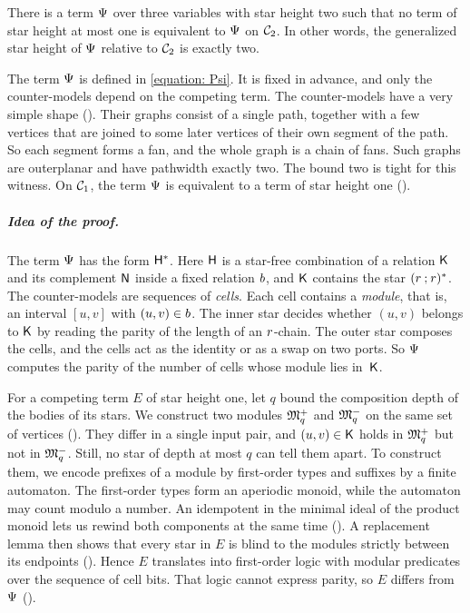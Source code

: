 \begin{theorem}\label{theorem: main}
  There is a term $\Psi$ over three variables with star height two such that no term of star height at most one is equivalent to $\Psi$ on $\mathcal{C}_{2}$.
  In other words, the generalized star height of $\Psi$ relative to $\mathcal{C}_{2}$ is exactly two.
\end{theorem}

The term $\Psi$ is defined in \eqref{equation: Psi}.
It is fixed in advance, and only the counter-models depend on the competing term.
The counter-models have a very simple shape ().
Their graphs consist of a single path, together with a few vertices that are joined to some later vertices of their own segment of the path.
So each segment forms a fan, and the whole graph is a chain of fans.
Such graphs are outerplanar and have pathwidth exactly two.
The bound two is tight for this witness.
On $\mathcal{C}_{1}$, the term $\Psi$ is equivalent to a term of star height one ().

\subparagraph*{Idea of the proof.}
The term $\Psi$ has the form $\mathsf{H}^*$.
Here $\mathsf{H}$ is a star-free combination of a relation $\mathsf{K}$ and its complement $\mathsf{N}$ inside a fixed relation $b$, and $\mathsf{K}$ contains the star $(r \mathbin{;} r)^*$.
The counter-models are sequences of \emph{cells}.
Each cell contains a \emph{module}, that is, an interval $[u, v]$ with $(u, v) \in b$.
The inner star decides whether $(u, v)$ belongs to $\mathsf{K}$ by reading the parity of the length of an $r$-chain.
The outer star composes the cells, and the cells act as the identity or as a swap on two ports.
So $\Psi$ computes the parity of the number of cells whose module lies in~$\mathsf{K}$.

For a competing term $E$ of star height one, let $q$ bound the composition depth of the bodies of its stars.
We construct two modules $\mathfrak{M}^{+}_q$ and $\mathfrak{M}^{-}_q$ on the same set of vertices ().
They differ in a single input pair, and $(u, v) \in \mathsf{K}$ holds in $\mathfrak{M}^{+}_q$ but not in $\mathfrak{M}^{-}_q$.
Still, no star of depth at most $q$ can tell them apart.
To construct them, we encode prefixes of a module by first-order types and suffixes by a finite automaton.
The first-order types form an aperiodic monoid, while the automaton may count modulo a number.
An idempotent in the minimal ideal of the product monoid lets us rewind both components at the same time ().
A replacement lemma then shows that every star in $E$ is blind to the modules strictly between its endpoints ().
Hence $E$ translates into first-order logic with modular predicates over the sequence of cell bits.
That logic cannot express parity, so $E$ differs from $\Psi$ ().

